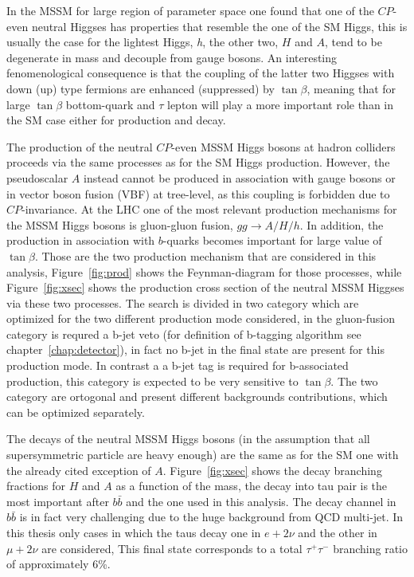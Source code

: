 In the MSSM for large region of parameter space one found that one of the 
$CP$-even neutral Higgses  has properties that resemble the one of the SM Higgs,
this is usually the case for the lightest Higgs, \emph{h}, the other two, $H$ and $A$, 
tend to be degenerate in mass and decouple from gauge bosons.
An interesting fenomenological consequence is that the coupling of the latter
two Higgses with down (up) type fermions are enhanced
(suppressed) by $\tan\beta$, meaning that for large $\tan\beta$
bottom-quark and $\tau$ lepton will play a more important role than in
the SM case either for production and decay.

The production of the neutral $CP$-even MSSM Higgs bosons at hadron
colliders proceeds via the same processes as for the SM Higgs
production. However, the pseudoscalar $A$ instead cannot be produced
in association with gauge bosons or in vector boson fusion (VBF) at
tree-level, as this coupling is forbidden due to $CP$-invariance.  At
the LHC one of the most relevant production mechanisms for the MSSM
Higgs bosons is gluon-gluon fusion, $gg\rightarrow A/H/h$. In
addition, the production in association with $b$-quarks becomes
important for large value of $\tan\beta$. Those are the two production mechanism
that are considered in this analysis, Figure~\ref{fig:prod} shows the Feynman-diagram
for those processes, while Figure~\ref{fig:xsec} shows the production cross section of the neutral 
MSSM Higgses via these two processes. The search is divided in two category which are optimized
for the two different production mode considered, in the gluon-fusion category
is requred a b-jet veto (for definition of b-tagging algorithm see chapter~\ref{chap:detector}), in fact no b-jet in the final state are present for this
production mode. In contrast a a b-jet tag is required for b-associated production,
this category is expected to be very sensitive to $\tan\beta$. The two category are
ortogonal and present different backgrounds contributions, which can be
optimized separately. 

The decays of the neutral
MSSM Higgs bosons (in the assumption that all supersymmetric particle
are heavy enough) are the same as for the SM one with the already
cited exception of $A$. Figure~\ref{fig:xsec} shows the decay branching fractions
for $H$ and $A$ as a function of the mass, 
the decay into tau pair is the most important after $b\bar{b}$ and the one used in this analysis. The 
decay channel in $b\bar{b}$ is in fact very challenging due to the huge background from
QCD multi-jet.
In this thesis only cases in which the taus decay one in $e + 2\nu$ and
the other in $\mu + 2\nu$ are considered, This final state corresponds to a total
$\tau^+\tau^-$ branching ratio of approximately 6\%.
 
